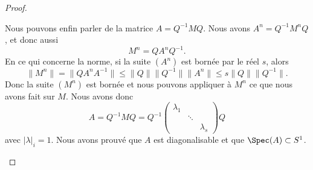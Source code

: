 \begin{proof}
\begin{subproof}
		\spitem[La matrice \( A\)]
		Nous pouvons enfin parler de la matrice \( A=Q^{-1}MQ\). Nous avons \( A^n=Q^{-1}M^nQ\), et donc aussi
		\begin{equation}
			M^n=QA^nQ^{-1}.
		\end{equation}
		En ce qui concerne la norme, si la suite \( (A^n)\) est bornée par le réel \( s\), alors
		\begin{equation}
			\| M^n \|=\| QA^nA^{-1} \|\leq \| Q \|\| Q^{-1} \|\| A^n \|\leq s\| Q \|\| Q^{-1} \|.
		\end{equation}
        Donc la suite \( (M^n)\) est bornée et nous pouvons appliquer à \( M^n\) ce que nous avons fait sur \( M\). Nous avons donc
		\begin{equation}
			A=Q^{-1}MQ=Q^{-1}\begin{pmatrix}
				\lambda_1 &        &           \\
				          & \ddots &           \\
				          &        & \lambda_s
			\end{pmatrix}Q
		\end{equation}
		avec \( | \lambda |_i=1\). Nous avons prouvé que \( A\) est diagonalisable et que \( \Spec(A)\subset S^1\).
	\end{subproof}
\end{proof}
